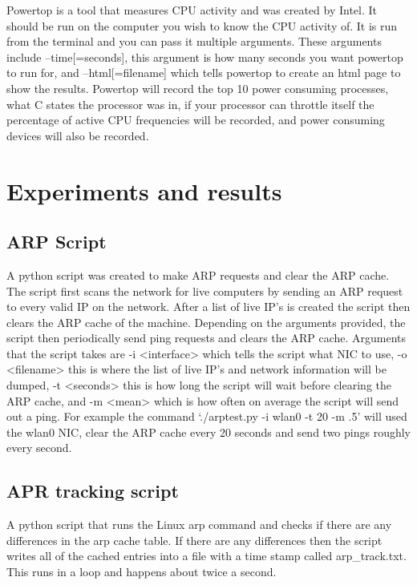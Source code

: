 \documentclass{article}
\begin{document}
Powertop is a tool that measures CPU activity and was created by Intel. It should be run on the computer you wish to know the CPU activity of. It is run from the terminal and you can pass it multiple arguments. These arguments include --time[=seconds], this argument is how many seconds you want powertop to run for, and --html[=filename] which tells powertop to create an html page to show the results. Powertop will record the top 10 power consuming processes, what C states the processor was in, if your processor can throttle itself the percentage of active CPU frequencies will be recorded, and power consuming devices will also be recorded.

\section{Experiments and results}
\subsection{ARP Script}
A python script was created to make ARP requests and clear the ARP cache. The script first scans the network for live computers by sending an ARP request to every valid IP on the network. After a list of live IP’s is created the script then clears the ARP cache of the machine. Depending on the arguments provided, the script then periodically send ping requests and clears the ARP cache. Arguments that the script takes are -i \textless interface\textgreater{} which tells the script what NIC to use, -o \textless filename\textgreater{} this is where the list of live IP’s and network information will be dumped, -t \textless seconds\textgreater{} this is how long the script will wait before clearing the ARP cache, and -m \textless mean\textgreater{} which is how often on average the script will send out a ping. For example the command ‘./arptest.py -i wlan0 -t 20 -m .5’ will used the wlan0 NIC, clear the ARP cache every 20 seconds and send two pings roughly every second.

\subsection{APR tracking script}
A python script that runs the Linux arp command and checks if there are any differences in the arp cache table. If there are any differences then the script writes all of the cached entries into a file with a time stamp called arp\_track.txt. This runs in a loop and happens about twice a second.
\end{document}
